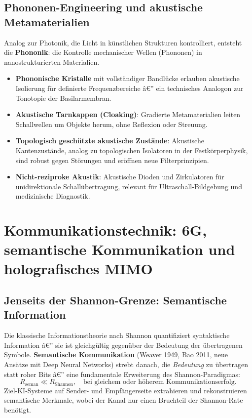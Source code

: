 ﻿\documentclass[12pt,a4paper,titlepage]{report}
\begin{document}
\subsection{Phononen-Engineering und akustische Metamaterialien}

Analog zur Photonik, die Licht in künstlichen Strukturen kontrolliert, entsteht
die \textbf{Phononik}: die Kontrolle mechanischer Wellen (Phononen) in
nanostrukturierten Materialien.
\begin{itemize}[leftmargin=2em]
    \item \textbf{Phononische Kristalle} mit vollständiger Bandlücke erlauben
        akustische Isolierung für definierte Frequenzbereiche â€” ein technisches
        Analogon zur Tonotopie der Basilarmembran.
    \item \textbf{Akustische Tarnkappen (Cloaking)}: Gradierte Metamaterialien
        leiten Schallwellen um Objekte herum, ohne Reflexion oder Streuung.
    \item \textbf{Topologisch geschützte akustische Zustände}: Akustische
        Kantenzustände, analog zu topologischen Isolatoren in der Festkörperphysik,
        sind robust gegen Störungen und eröffnen neue Filterprinzipien.
    \item \textbf{Nicht-reziproke Akustik}: Akustische Dioden und Zirkulatoren
        für unidirektionale Schallübertragung, relevant für Ultraschall-Bildgebung
        und medizinische Diagnostik.
\end{itemize}

\section{Kommunikationstechnik: 6G, semantische Kommunikation und holografisches
MIMO}

\subsection{Jenseits der Shannon-Grenze: Semantische Information}

Die klassische Informationstheorie nach Shannon quantifiziert syntaktische
Information â€” sie ist gleichgültig gegenüber der Bedeutung der übertragenen Symbole.
\textbf{Semantische Kommunikation} (Weaver 1949, Bao 2011, neue Ansätze mit
Deep Neural Networks) strebt danach, die \emph{Bedeutung} zu übertragen statt
roher Bits â€” eine fundamentale Erweiterung des Shannon-Paradigmas:
\[
    R_{\text{seman}} \ll R_{\text{Shannon}}, \quad
    \text{bei gleichem oder höherem Kommunikationserfolg.}
\]
Ziel-KI-Systeme auf Sender- und Empfängerseite extrahieren und rekonstruieren
semantische Merkmale, wobei der Kanal nur einen Bruchteil der Shannon-Rate benötigt.
\end{document}
